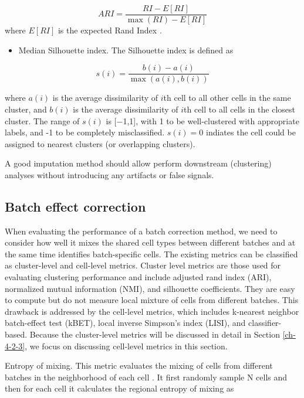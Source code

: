 \documentclass[
]{book}
\providecommand{\tightlist}{%
  \setlength{\itemsep}{0pt}\setlength{\parskip}{0pt}}
\begin{document}
\[ARI = \frac{RI-E[RI]}{\max(RI)-E[RI]}\]
where \(E[RI]\) is the expected Rand Index \citep{RN107}.

\begin{itemize}
\tightlist
\item
  Median Silhouette index. The Silhouette index is defined as
\end{itemize}

\[ s(i)=\frac{b(i)-a(i)}{\max(a(i),b(i))}\]

where \(a(i)\) is the average dissimilarity of \(i\)th cell to all other cells in the same cluster, and \(b(i)\) is the average dissimilarity of \(i\)th cell to all cells in the closest cluster. The range of \(s(i)\) is {[}−1,1{]}, with 1 to be well-clustered with appropriate labels, and -1 to be completely misclassified. \(s(i) = 0\) indiates the cell could be assigned to nearest clusters (or overlapping clusters).

A good imputation method should allow perform downstream (clustering) analyses without introducing any artifacts or false signals.

\hypertarget{ch-4-1-2}{%
\subsection{Batch effect correction}\label{ch-4-1-2}}

When evaluating the performance of a batch correction method, we need to consider how well it mixes the shared cell types between different batches and at the same time identifies batch-specific cells. The existing metrics can be classified as cluster-level and cell-level metrics. Cluster level metrics are those used for evaluating clustering performance and include adjusted rand index (ARI), normalized mutual information (NMI), and silhouette coefficients. They are easy to compute but do not measure local mixture of cells from different batches. This drawback is addressed by the cell-level metrics, which includes k-nearest neighbor batch-effect test (kBET), local inverse Simpson's index (LISI), and classifier-based. Because the cluster-level metrics will be discussed in detail in Section \ref{ch-4-2-3}, we focus on discussing cell-level metrics in this section.

Entropy of mixing. This metric evaluates the mixing of cells from different batches in the neighborhood of each cell \citep{RN84}. It first randomly sample N cells and then for each cell it calculates the regional entropy of mixing as
\end{document}
